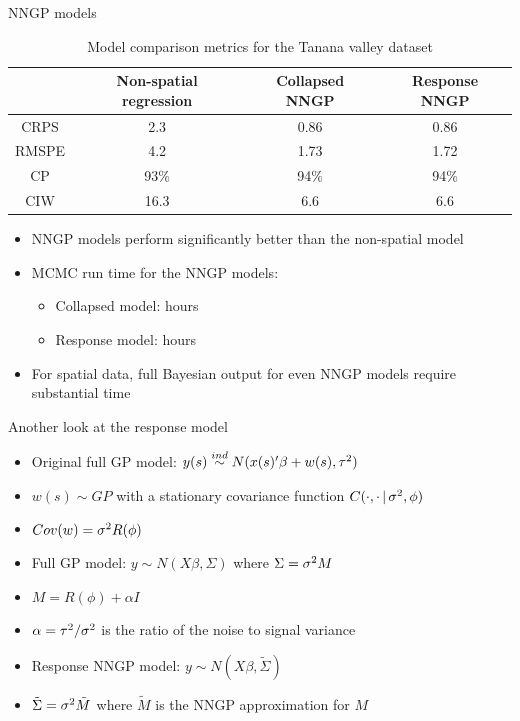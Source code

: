\begin{frame}{NNGP models}
\begin{table}
{\small	\begin{tabular}{cccc}
& 		Non-spatial regression & Collapsed NNGP & Response NNGP \\ \hline
CRPS & 2.3 & 0.86 & 0.86 \\
RMSPE & 4.2 & 1.73 & 1.72 \\
CP & 93\% & 94\% & 94\% \\
CIW & 16.3 & 6.6 & 6.6 \\\hline
	\end{tabular}}
\caption{Model comparison metrics for the Tanana valley dataset}
\end{table}
\vskip -4mm \begin{itemize}
	\item NNGP models perform significantly better than the non-spatial model
	\item MCMC run time for the NNGP models:
		\begin{itemize}
			\item Collapsed model:  hours
			\item Response model:  hours
		\end{itemize}
	\item For  spatial data, full Bayesian output for even NNGP models require substantial time
\end{itemize}
\end{frame}

\begin{frame}{Another look at the response model}
	\begin{itemize}
	\item Original full GP model: $y(s) \overset{ind}{\sim} N(x(s)'\beta + w(s), \tau^2)$
	\item $w(s) \sim GP$ with a stationary covariance function $C(\cdot, \cdot \,|\, \sigma^2, \phi)$  
	\item $Cov(w) = \sigma^2 R(\phi)$
	\item Full GP model: $y \sim N(X\beta, \Sigma)$ where $\Sigma = \sigma^2 M$
	\item $M= R(\phi) + \alpha I$
	\item $\alpha = \tau^2/\sigma^2$ is the ratio of the \alert{noise to signal variance}
	\item Response NNGP model: $y \sim N(X\beta, \tilde \Sigma)$
	\item $\tilde \Sigma = \sigma^2 \tilde M$ where $\tilde M$ is the NNGP approximation for $M$
	\end{itemize}
\end{frame}

